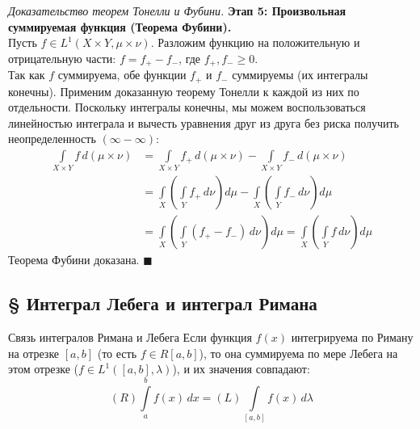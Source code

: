 \documentclass[12pt,a4paper]{article}
\newenvironment{Proof}[1][Доказательство]{\vspace{0.5em}\noindent\textit{#1.}\hspace{0.5em}\ignorespaces}{\hfill$\blacksquare$\vspace{1em}}
\begin{document}
\begin{Proof}[Доказательство теорем Тонелли и Фубини]
\textbf{Этап 5: Произвольная суммируемая функция (Теорема Фубини).} \\
Пусть $f \in L^1(X \times Y, \mu \times \nu)$. Разложим функцию на положительную и отрицательную части: $f = f_+ - f_-$, где $f_+, f_- \ge 0$. \\
Так как $f$ суммируема, обе функции $f_+$ и $f_-$ суммируемы (их интегралы конечны). Применим доказанную теорему Тонелли к каждой из них по отдельности. 
Поскольку интегралы конечны, мы можем воспользоваться линейностью интеграла и вычесть уравнения друг из друга без риска получить неопределенность $(\infty - \infty)$:
\begin{align*}
    \int\limits_{X \times Y} f \, d(\mu \times \nu) &= \int\limits_{X \times Y} f_+ \, d(\mu \times \nu) - \int\limits_{X \times Y} f_- \, d(\mu \times \nu) \\
    &= \int\limits_X \left( \int\limits_Y f_+ \, d\nu \right) d\mu - \int\limits_X \left( \int\limits_Y f_- \, d\nu \right) d\mu \\
    &= \int\limits_X \left( \int\limits_Y (f_+ - f_-) \, d\nu \right) d\mu = \int\limits_X \left( \int\limits_Y f \, d\nu \right) d\mu
\end{align*}
Теорема Фубини доказана.
\end{Proof}

\subsection{§ Интеграл Лебега и интеграл Римана}

\begin{Theorem}{Связь интегралов Римана и Лебега}{}
Если функция $f(x)$ интегрируема по Риману на отрезке $[a, b]$ (то есть $f \in R[a,b]$), то она суммируема по мере Лебега на этом отрезке ($f \in L^1([a,b], \lambda)$), и их значения совпадают:
$$ (R) \int\limits_a^b f(x) \, dx = (L) \int\limits_{[a, b]} f(x) \, d\lambda $$
\end{Theorem}
\end{document}
